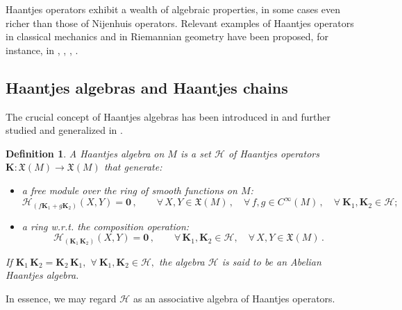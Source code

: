 \documentclass[10pt]{amsart}
\numberwithin{equation}{section}
\newtheorem{definition}{Definition}
\theoremstyle{definition}
\begin{document}

Haantjes operators exhibit a wealth of algebraic properties, in some cases even richer than those of Nijenhuis operators. Relevant examples of Haantjes operators in classical mechanics and in Riemannian geometry have been proposed, for instance, in \cite{RTT2022CNS},  \cite{RTT2024AMPA}, \cite{TT2022AMPA}, \cite{TT2021JGP}.



\subsection{Haantjes algebras and Haantjes chains}
\label{subsec:2.2}
The crucial concept of Haantjes algebras has been introduced in \cite{TT2021JGP} and further studied and generalized in \cite{RTT2023JNS}. 
\begin{definition}\label{def:HA}
A Haantjes algebra on $M$ is a set $\mathscr{H}$ of Haantjes  operators $\boldsymbol{K}:\mathfrak{X}(M)\to \mathfrak{X}(M)$ that generate:
\begin{itemize}
\item
a free module over the ring of smooth functions on $M$:
\begin{equation}
\label{eq:Hmod}
\mathcal{H}_{\left( f\boldsymbol{K}_{1} + g\boldsymbol{K}_2 \right)}(X,Y)= \mathbf{0}
 \, , \qquad\forall\, X, Y \in \mathfrak{X}(M) \, , \quad \forall\, f,g \in C^\infty(M) \,  , \quad \forall ~\boldsymbol{K}_1,\boldsymbol{K}_2 \in  \mathscr{H} ;
\end{equation}
  \item
a ring  w.r.t. the composition operation:
\begin{equation}
 \label{eq:Hring}
\mathcal{H}_{(\boldsymbol{K}_1 \, \boldsymbol{K}_2)}(X,Y)=\mathbf{0} \, , \qquad
\forall\, \boldsymbol{K}_1,\boldsymbol{K}_2\in  \mathscr{H} , \quad\forall\, X, Y \in \mathfrak{X}(M)\, .
\end{equation}
\end{itemize}
If $\boldsymbol{K}_1\,\boldsymbol{K}_2=\boldsymbol{K}_2\,\boldsymbol{K}_1,$ $\forall~\boldsymbol{K}_1,\boldsymbol{K}_2 \in  \mathscr{H},$
the  algebra $\mathscr{H}$ is said to be an Abelian  Haantjes algebra. 
\end{definition}
In essence, we may regard $\mathscr{H}$ as an associative algebra of Haantjes operators.
\end{document}
